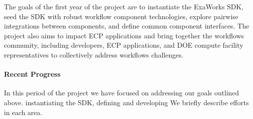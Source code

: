 The goals of the first year of the project are to instantiate the ExaWorks SDK, seed the SDK with
robust workflow component technologies, explore pairwise integrations between components, and define
common component interfaces.  The project also aims to impact ECP applications and
bring together the workflows community, including developers, ECP applications, and DOE compute facility representatives
to collectively address workflows challenges.

\paragraph{Recent Progress}



In this period of the project we have focused on addressing our goals outlined above. instantiating the SDK, defining and developing
We briefly describe efforts in each area. 

